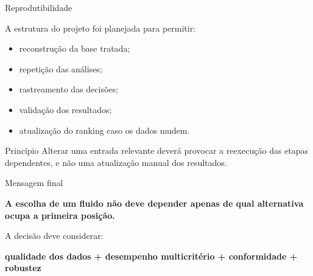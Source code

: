 
\begin{frame}{Reprodutibilidade}

    A estrutura do projeto foi planejada para permitir:

    \begin{itemize}
        \item reconstrução da base tratada;
        \item repetição das análises;
        \item rastreamento das decisões;
        \item validação dos resultados;
        \item atualização do ranking caso os dados mudem.
    \end{itemize}

    \vspace{0.3cm}

    \begin{block}{Princípio}
        Alterar uma entrada relevante deverá provocar a reexecução
        das etapas dependentes, e não uma atualização manual dos
        resultados.
    \end{block}

\end{frame}



\begin{frame}{Mensagem final}

    \begin{center}

        \Large

        \textbf{A escolha de um fluido não deve depender apenas de
        qual alternativa ocupa a primeira posição.}

        \vspace{0.6cm}

        \normalsize

        A decisão deve considerar:

        \vspace{0.3cm}

        \textbf{
        qualidade dos dados
        +
        desempenho multicritério
        +
        conformidade
        +
        robustez
        }

    \end{center}

\end{frame}


